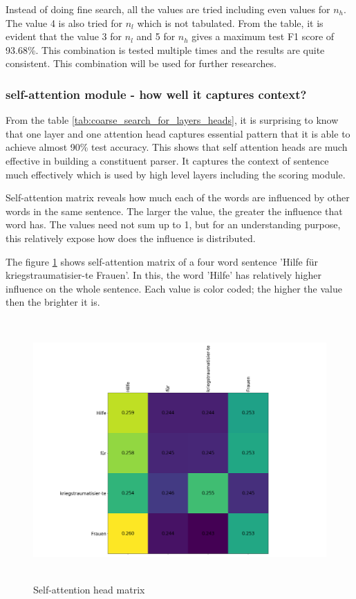 \documentclass[a4paper, 11pt]{article}
\begin{document}
Instead of doing fine search, all the values are tried including even values for $n_h$. The value 4 is also tried for $n_l$ which is not tabulated. From the table, it is evident that the value 3 for $n_l$ and 5 for $n_h$ gives a maximum test F1 score of 93.68\%. This combination is tested multiple times and the results are quite consistent. This combination will be used for further researches. 

\subsubsection{self-attention module - how well it captures context? }

From the table \ref{tab:coarse_search_for_layers_heads}, it is surprising to know that one layer and one attention head captures essential pattern that it is able to achieve almost 90\% test accuracy. This shows that self attention heads are much effective in building a constituent parser. It captures the context of sentence much effectively which is used by high level layers including the scoring module.

Self-attention matrix reveals how much each of the words are influenced by other words in the same sentence. The larger the value, the greater the influence that word has. The values need not sum up to 1, but for an understanding purpose, this relatively expose how does the influence is distributed. 

The figure \ref{fig:self-attention-head-matrix} shows self-attention matrix of a four word sentence 'Hilfe für kriegstraumatisier-te Frauen'. In this, the word 'Hilfe' has relatively higher influence on the whole sentence. Each value is color coded; the higher the value then the brighter it is.

\begin{figure}[H]
    \centering
    \includegraphics[width=\textwidth,height=10cm,keepaspectratio=true]
    {attention-head-matrix.png}
    \caption{
        Self-attention head matrix
    }
    \label{fig:self-attention-head-matrix}
\end{figure}
\end{document}
